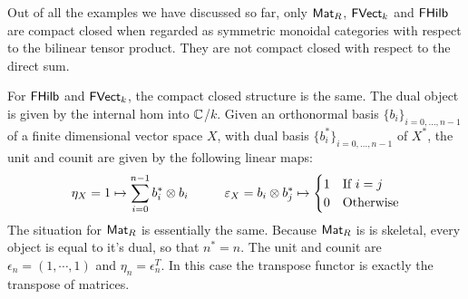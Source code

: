 \begin{example}
Out of all the examples we have discussed so far, only $\Mat_R$, $\FVect_k$ and $\FHilb$ are compact closed when regarded as symmetric monoidal categories with respect to the bilinear tensor product.  They are not compact closed with respect to the direct sum.

For $\FHilb$ and $\FVect_k$, the compact closed structure is the same.  The dual object is given by the internal hom into $\C$/$k$.  Given an orthonormal basis $\{ b_i \}_{i=0,\ldots, n-1}$ of a finite dimensional vector space $X$, with dual basis $\{b_i^* \}_{i=0,\ldots, n-1}$ of $X^*$, the unit and counit are given by the following linear maps:
$$
\eta_X = 1 \mapsto \sum_{i=0}^{n-1} b_i^* \otimes b_i \hspace*{1cm}\epsilon_X = b_i\otimes b_j^* \mapsto 
\begin{cases}
1 & \text{If $i=j$}\\
0 & \text {Otherwise}
\end{cases}
$$
The situation for $\Mat_R$ is essentially the same.
Because $\Mat_R$ is is skeletal, every object is equal to it's dual, so that $n^*=n$.
The unit and counit are $\epsilon_n=(1,\cdots, 1)$ and  $\eta_n=\epsilon_n^T$.  In this case the transpose functor is exactly the transpose of matrices. 
\end{example}






